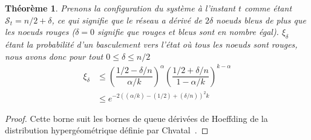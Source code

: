 \documentclass[letterpaper,twocolumn,10pt]{article}
\newtheorem{theorem}{Théorème}
\theoremstyle{definition}
\begin{document}

\begin{theorem}
Prenons la configuration du système à l'instant $t$ comme étant $\mathcal{S}_t = n/2 + \delta$, ce qui signifie que le
réseau a dérivé de $2\delta$ noeuds bleus de plus que les noeuds rouges ($\delta = 0$ signifie que rouges et bleus
sont en nombre égal). $\xi_\delta$ étant la probabilité d'un basculement vers l'état où tous les noeuds sont rouges,
nous avons donc pour tout $0 \leq \delta \leq n/2$
\begin{equation}
\begin{split}
    \xi_\delta &\leq \left(\dfrac{1/2 - \delta/n}{\alpha/k}\right)^{\alpha}\left(\dfrac{1/2 + \delta/n}{1- \alpha/k}\right)^{k-\alpha}\\
    &\leq e^{-2((\alpha/k) - (1/2) + (\delta/n))^2 k}
\end{split}
\end{equation}
\end{theorem}

\begin{proof}
Cette borne suit les bornes de queue dérivées de Hoeffding de la distribution hypergéométrique définie par
Chvatal~\cite{chvatal1979tail}.
\end{proof}

\end{document}
